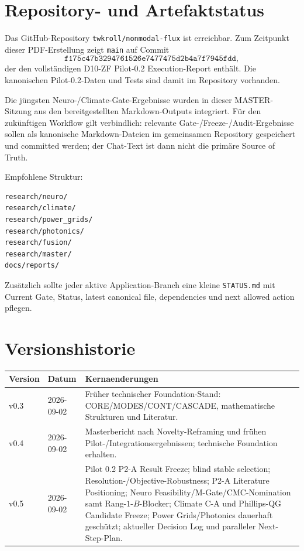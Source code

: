 \section{Repository- und Artefaktstatus}
Das GitHub-Repository \texttt{twkroll/nonmodal-flux} ist erreichbar. Zum Zeitpunkt dieser PDF-Erstellung zeigt \texttt{main} auf Commit
\[
\texttt{f175c47b3294761526e7477475d2b4a7f7945fdd},
\]
der den vollständigen D10-ZF Pilot-0.2 Execution-Report enthält. Die kanonischen Pilot-0.2-Daten und Tests sind damit im Repository vorhanden.

Die jüngsten Neuro-/Climate-Gate-Ergebnisse wurden in dieser MASTER-Sitzung aus den bereitgestellten Markdown-Outputs integriert. Für den zukünftigen Workflow gilt verbindlich: relevante Gate-/Freeze-/Audit-Ergebnisse sollen als kanonische Markdown-Dateien im gemeinsamen Repository gespeichert und committed werden; der Chat-Text ist dann nicht die primäre Source of Truth.

Empfohlene Struktur:
\begin{verbatim}
research/neuro/
research/climate/
research/power_grids/
research/photonics/
research/fusion/
research/master/
docs/reports/
\end{verbatim}
Zusätzlich sollte jeder aktive Application-Branch eine kleine \texttt{STATUS.md} mit Current Gate, Status, latest canonical file, dependencies und next allowed action pflegen.

\section{Versionshistorie}
\begin{center}
\small
\begin{tabularx}{\textwidth}{p{2.1cm}p{2.6cm}X}
\toprule
Version & Datum & Kernaenderungen\\
\midrule
v0.3 & 2026-09-02 & Früher technischer Foundation-Stand: CORE/MODES/CONT/CASCADE, mathematische Strukturen und Literatur.\\
v0.4 & 2026-09-02 & Masterbericht nach Novelty-Reframing und frühen Pilot-/Integrationsergebnissen; technische Foundation erhalten.\\
v0.5 & 2026-09-02 & Pilot 0.2 P2-A Result Freeze; blind stable selection; Resolution-/Objective-Robustness; P2-A Literature Positioning; Neuro Feasibility/M-Gate/CMC-Nomination samt Rang-$1$-$B$-Blocker; Climate C-A und Phillips-QG Candidate Freeze; Power Grids/Photonics dauerhaft geschützt; aktueller Decision Log und paralleler Next-Step-Plan.\\
\bottomrule
\end{tabularx}
\end{center}

